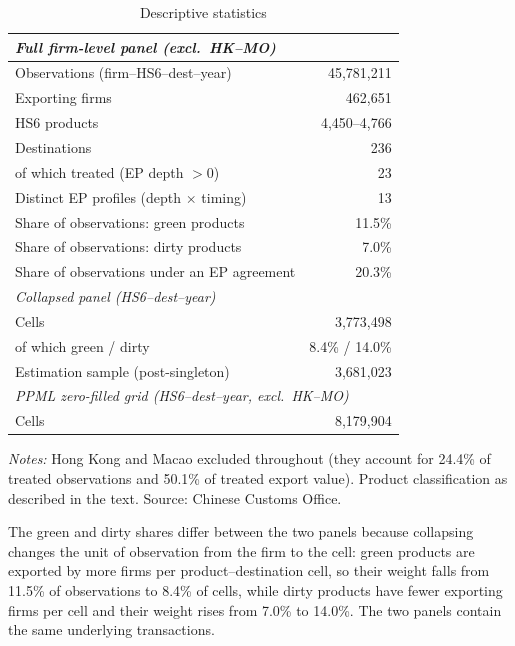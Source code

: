 \documentclass[12pt]{article}
\begin{document}
\begin{table}[htbp]
\centering
\caption{Descriptive statistics}
\label{tab:descriptives}
\small
\begin{threeparttable}
\begin{tabular}{lr}
\toprule
\multicolumn{2}{l}{\textit{Full firm-level panel (excl.\ HK--MO)}} \\
\midrule
Observations (firm--HS6--dest--year) & 45{,}781{,}211 \\
Exporting firms & 462{,}651 \\
HS6 products & 4{,}450--4{,}766 \\
Destinations & 236 \\
\quad of which treated (EP depth $>0$) & 23 \\
Distinct EP profiles (depth $\times$ timing) & 13 \\
Share of observations: green products & 11.5\% \\
Share of observations: dirty products & 7.0\% \\
Share of observations under an EP agreement & 20.3\% \\
\midrule
\multicolumn{2}{l}{\textit{Collapsed panel (HS6--dest--year)}} \\
\midrule
Cells & 3{,}773{,}498 \\
\quad of which green / dirty & 8.4\% / 14.0\% \\
Estimation sample (post-singleton) & 3{,}681{,}023 \\
\midrule
\multicolumn{2}{l}{\textit{PPML zero-filled grid (HS6--dest--year, excl.\ HK--MO)}} \\
\midrule
Cells & 8{,}179{,}904 \\
\bottomrule
\end{tabular}
\begin{tablenotes}\footnotesize
\item \emph{Notes:} Hong Kong and Macao excluded throughout (they account for 24.4\% of treated
observations and 50.1\% of treated export value). Product classification as described
in the text. Source: Chinese Customs Office.
\item The green and dirty shares differ between the two panels because collapsing changes the unit
of observation from the firm to the cell: green products are exported by more firms per
product--destination cell, so their weight falls from 11.5\% of observations to 8.4\% of cells,
while dirty products have fewer exporting firms per cell and their weight rises from 7.0\% to
14.0\%. The two panels contain the same underlying transactions.
\end{tablenotes}
\end{threeparttable}
\end{table}
\end{document}
